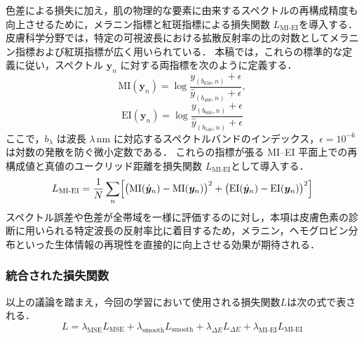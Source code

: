 \documentclass[MIRU,submit]{miru2026j}
\begin{document}
色差による損失に加え，肌の物理的な要素に由来するスペクトルの再構成精度も向上させるために，メラニン指標と紅斑指標による損失関数 $L_{\mathrm{MI\text{-}EI}}$を導入する．
皮膚科学分野では，特定の可視波長における拡散反射率の比の対数としてメラニン指標および紅斑指標が広く用いられている\cite{art:takiwaki}．
本稿では，これらの標準的な定義に従い，スペクトル ${\bm{y}_n}$ に対する両指標を次のように定義する．
\begin{equation}
\mathrm{MI}({\bm{y}}_n) = \log\frac{{y}_{(b_{650}, n)}+\epsilon}{\hat{y}_{(b_{480}, n)}+\epsilon}, \label{eq:mi}
\end{equation}
\begin{equation}
\mathrm{EI}({\bm{y}}_n) = \log\frac{{y}_{(b_{660}, n)}+\epsilon}{\hat{y}_{(b_{540}, n)}+\epsilon} \label{eq:ei}
\end{equation}
ここで，$b_{\lambda}$ は波長 $\lambda\,\mathrm{nm}$ に対応するスペクトルバンドのインデックス，$\epsilon=10^{-6}$ は対数の発散を防ぐ微小定数である．
これらの指標が張る MI--EI 平面上での再構成値と真値のユークリッド距離を損失関数 $L_{\mathrm{MI\text{-}EI}}$として導入する．
\begin{equation}
L_{\mathrm{MI\text{-}EI}}
= \frac{1}{N} \sum_{n}
\Bigl[ \bigl(\mathrm{MI}(\hat{\bm{y}}_n) - \mathrm{MI}(\bm{y}_n)\bigr)^2
+ \bigl(\mathrm{EI}(\hat{\bm{y}}_n) - \mathrm{EI}(\bm{y}_n)\bigr)^2 \Bigr] \label{eq:loss_miei}
\end{equation}
スペクトル誤差や色差が全帯域を一様に評価するのに対し，本項は皮膚色素の診断に用いられる特定波長の反射率比に着目するため，メラニン，ヘモグロビン分布といった生体情報の再現性を直接的に向上させる効果が期待される．

\subsubsection{統合された損失関数}\label{subsec:loss_all}
以上の議論を踏まえ，今回の学習において使用される損失関数$L$は次の式で表される．
\begin{equation}
L = \lambda_{\mathrm{MSE}} L_{\mathrm{MSE}}
+ \lambda_{\mathrm{smooth}} L_{\mathrm{smooth}}
+ \lambda_{\Delta E} L_{\Delta E}
+ \lambda_{\mathrm{MI\text{-}EI}} L_{\mathrm{MI\text{-}EI}} \label{eq:loss_all}
\end{equation}
\end{document}
